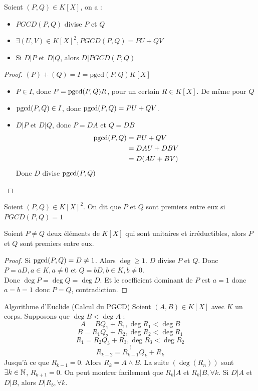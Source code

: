 \documentclass[]{report}
\begin{document}
    \begin{prop}{}{}
        Soient $(P,Q)\in K[X]$, on a :\begin{itemize}
            \item $PGCD(P,Q)$ divise $P$ et $Q$
            \item $\exists(U,V)\in K[X]^2,PGCD(P,Q)=PU+QV$
            \item Si $D|P$ et $D|Q$, alors $D|PGCD(P,Q)$
        \end{itemize}
    \end{prop}

    \begin{proof}
        $(P)+(Q)=I=\text{pgcd}(P,Q)K[X]$
        \begin{itemize}
            \item $P\in I$, donc $P=\text{pgcd} (P,Q) R$, pour un certain $R\in K[X]$. De même pour $Q$
            \item $\text{pgcd} (P,Q)\in I$, donc $\text{pgcd} (P,Q)=PU+QV$.
            \item $D|P$ et $D|Q$, donc $P=DA$ et $Q=DB$
            \begin{align*}
                \text{pgcd}(P,Q)&=PU+QV\\
                &=DAU+DBV\\
                &=D(AU+BV)
            \end{align*}
            Donc $D$ divise $\text{pgcd} (P,Q)$
        \end{itemize}
    \end{proof}

    \begin{df}{}{}
        Soient $(P,Q)\in K[X]^2$. On dit que $P$ et $Q$ sont premiers entre eux si $PGCD(P,Q)=1$
    \end{df}

    \begin{prop}{}{}
        Soient $P\neq Q$ deux éléments de $K[X]$ qui sont unitaires et irréductibles, alors $P$ et $Q$ sont premiers entre eux.
    \end{prop}

    \begin{proof}
        Si $\text{pgcd}(P,Q)=D\neq 1$. Alors $\deg \ge 1$. $D$ divise $P$ et $Q$. Donc $P=aD,a\in K,a\neq 0$ et $Q=bD,b\in K,b\neq 0$.\\
        Donc $\deg P=\deg Q=\deg D$. Et le coefficient dominant de $P$ est $a=1$ donc $a=b=1$ donc $P=Q$, contradiction.
    \end{proof}

    \begin{prop}{Algorithme d'Euclide (Calcul du PGCD)}{}
        Soient $(A,B)\in K[X]$ avec $K$ un corps. Supposons que $\deg B< \deg A$ :
        $$A=BQ_1+R_1, \deg R_1<\deg B$$
        $$B=R_1Q_2+R_2, \deg R_2<\deg R_1$$
        $$R_1=R_2Q_3+R_3, \deg R_3<\deg R_2$$
        $$\vdots$$
        $$R_{k-2}=R_{k-1}Q_k+R_k$$
        Jusqu'à ce que $R_{k-1}=0$. Alors $R_k=A\wedge B$. La suite $(\deg(R_n))$ sont \tq $\exists k\in\mathbb{N}$, \tq $R_{k+1}=0$. On peut montrer facilement que $R_k|A$ et $R_k|B,\forall k$. Si $D|A$ et $D|B$, alors $D|R_b,\forall k$.
    \end{prop}
\end{document}
